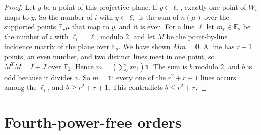\documentclass[11pt]{amsart}
\theoremstyle{definition}
\theoremstyle{remark}
\newcommand{\F}{\mathbb{F}}
\newcommand{\one}{\mathbf{1}}
\begin{document}
\begin{proof}
Let $y$ be a point of this projective plane. If $y\in\ell_i$, exactly one point of $W_i$ maps to $y$. So the number of $i$ with $y\in\ell_i$ is the sum of $n(\mu)$ over the supported points $\F_r\mu$ that map to $y$, and it is even. For a line $\ell$ let $m_\ell\in\F_2$ be the number of $i$ with $\ell_i=\ell$, modulo $2$, and let $M$ be the point-by-line incidence matrix of the plane over $\F_2$. We have shown $Mm=0$. A line has $r+1$ points, an even number, and two distinct lines meet in one point, so $M^{T}M=I+J$ over $\F_2$. Hence $m=(\sum_\ell m_\ell)\one$. The sum is $b$ modulo $2$, and $b$ is odd because it divides $v$. So $m=\one$: every one of the $r^2+r+1$ lines occurs among the $\ell_i$, and $b\ge r^2+r+1$. This contradicts $b\le r^2+r$.
\end{proof}

\section{Fourth-power-free orders}\label{sec:squarefree}
\end{document}
